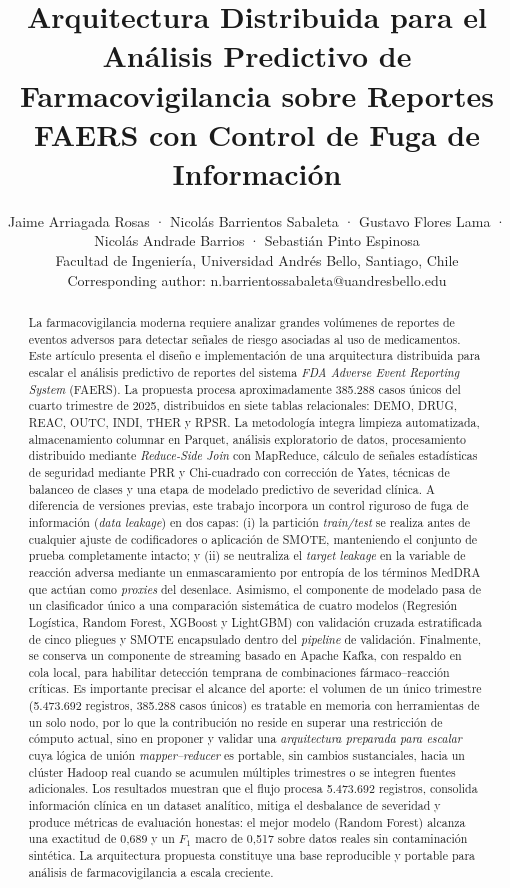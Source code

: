 \documentclass[12pt,a4paper]{article}
\title{\textbf{Arquitectura Distribuida para el Análisis Predictivo de Farmacovigilancia sobre Reportes FAERS con Control de Fuga de Información}}
\author{Jaime Arriagada Rosas · Nicolás Barrientos Sabaleta · Gustavo Flores Lama ·\\
Nicolás Andrade Barrios · Sebastián Pinto Espinosa\\[0.3cm]
\small Facultad de Ingeniería, Universidad Andrés Bello, Santiago, Chile\\
\small Corresponding author: n.barrientossabaleta@uandresbello.edu}
\date{}
\begin{document}
\maketitle

\begin{abstract}
La farmacovigilancia moderna requiere analizar grandes volúmenes de reportes de eventos adversos para detectar señales de riesgo asociadas al uso de medicamentos. Este artículo presenta el diseño e implementación de una arquitectura distribuida para escalar el análisis predictivo de reportes del sistema \textit{FDA Adverse Event Reporting System} (FAERS). La propuesta procesa aproximadamente 385.288 casos únicos del cuarto trimestre de 2025, distribuidos en siete tablas relacionales: DEMO, DRUG, REAC, OUTC, INDI, THER y RPSR. La metodología integra limpieza automatizada, almacenamiento columnar en Parquet, análisis exploratorio de datos, procesamiento distribuido mediante \textit{Reduce-Side Join} con MapReduce, cálculo de señales estadísticas de seguridad mediante PRR y Chi-cuadrado con corrección de Yates, técnicas de balanceo de clases y una etapa de modelado predictivo de severidad clínica. A diferencia de versiones previas, este trabajo incorpora un control riguroso de fuga de información (\textit{data leakage}) en dos capas: (i) la partición \textit{train/test} se realiza antes de cualquier ajuste de codificadores o aplicación de SMOTE, manteniendo el conjunto de prueba completamente intacto; y (ii) se neutraliza el \textit{target leakage} en la variable de reacción adversa mediante un enmascaramiento por entropía de los términos MedDRA que actúan como \textit{proxies} del desenlace. Asimismo, el componente de modelado pasa de un clasificador único a una comparación sistemática de cuatro modelos (Regresión Logística, Random Forest, XGBoost y LightGBM) con validación cruzada estratificada de cinco pliegues y SMOTE encapsulado dentro del \textit{pipeline} de validación. Finalmente, se conserva un componente de streaming basado en Apache Kafka, con respaldo en cola local, para habilitar detección temprana de combinaciones fármaco--reacción críticas. Es importante precisar el alcance del aporte: el volumen de un único trimestre (5.473.692 registros, 385.288 casos únicos) es tratable en memoria con herramientas de un solo nodo, por lo que la contribución no reside en superar una restricción de cómputo actual, sino en proponer y validar una \textit{arquitectura preparada para escalar} cuya lógica de unión \textit{mapper--reducer} es portable, sin cambios sustanciales, hacia un clúster Hadoop real cuando se acumulen múltiples trimestres o se integren fuentes adicionales. Los resultados muestran que el flujo procesa 5.473.692 registros, consolida información clínica en un dataset analítico, mitiga el desbalance de severidad y produce métricas de evaluación honestas: el mejor modelo (Random Forest) alcanza una exactitud de 0,689 y un \(F_1\) macro de 0,517 sobre datos reales sin contaminación sintética. La arquitectura propuesta constituye una base reproducible y portable para análisis de farmacovigilancia a escala creciente.
\end{abstract}
\end{document}

